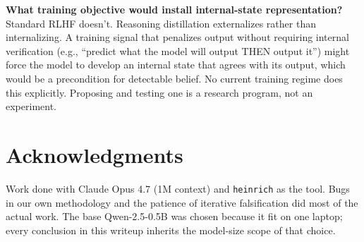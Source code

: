 \documentclass[11pt,a4paper]{article}
\begin{document}
\textbf{What training objective would install internal-state representation?} Standard RLHF doesn't. Reasoning distillation externalizes rather than internalizing. A training signal that penalizes output without requiring internal verification (e.g., ``predict what the model will output THEN output it'') might force the model to develop an internal state that agrees with its output, which would be a precondition for detectable belief. No current training regime does this explicitly. Proposing and testing one is a research program, not an experiment.


\section*{Acknowledgments}

Work done with Claude Opus 4.7 (1M context) and \texttt{heinrich} as the tool. Bugs in our own methodology and the patience of iterative falsification did most of the actual work. The base Qwen-2.5-0.5B was chosen because it fit on one laptop; every conclusion in this writeup inherits the model-size scope of that choice.
\end{document}
